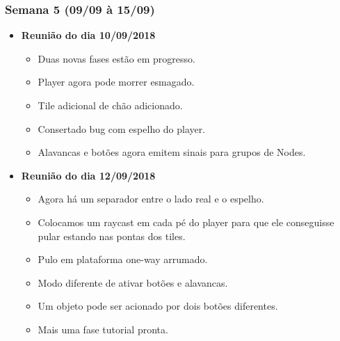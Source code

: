 \documentclass[a4paper, 11pt]{article}
\begin{document}
\subsubsection{Semana 5 (09/09 à 15/09)}
	\begin{itemize} 
		\item \textbf{Reunião do dia 10/09/2018}

		\begin{itemize}
    		
    		\item Duas novas fases estão em progresso.
    		\item Player agora pode morrer esmagado.
    		\item Tile adicional de chão adicionado.
    		\item Consertado bug com espelho do player.
    		\item Alavancas e botões agora emitem sinais para grupos de Nodes.

   		\end{itemize}

		\item \textbf{Reunião do dia 12/09/2018}

		\begin{itemize}
    			
    		\item Agora há um separador entre o lado real e o espelho.
    		\item Colocamos um raycast em cada pé do player para que ele conseguisse pular estando nas pontas dos tiles.
    		\item Pulo em plataforma one-way arrumado.
    		\item Modo diferente de ativar botões e alavancas.
    		\item Um objeto pode ser acionado por dois botões diferentes.
    		\item Mais uma fase tutorial pronta.

		\end{itemize}

	\end{itemize}
\end{document}
